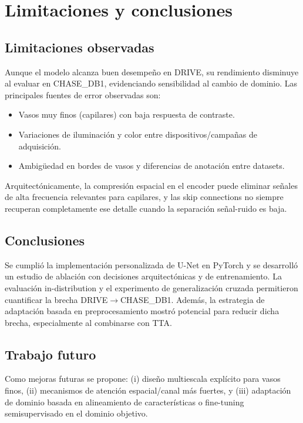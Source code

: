 \section{Limitaciones y conclusiones}
\subsection{Limitaciones observadas}
Aunque el modelo alcanza buen desempeño en DRIVE, su rendimiento disminuye al evaluar en CHASE\_DB1, evidenciando sensibilidad al cambio de dominio. Las principales fuentes de error observadas son:
\begin{itemize}
    \item Vasos muy finos (capilares) con baja respuesta de contraste.
    \item Variaciones de iluminación y color entre dispositivos/campañas de adquisición.
    \item Ambigüedad en bordes de vasos y diferencias de anotación entre datasets.
\end{itemize}

Arquitectónicamente, la compresión espacial en el encoder puede eliminar señales de alta frecuencia relevantes para capilares, y las skip connections no siempre recuperan completamente ese detalle cuando la separación señal-ruido es baja.

\subsection{Conclusiones}
Se cumplió la implementación personalizada de U-Net en PyTorch y se desarrolló un estudio de ablación con decisiones arquitectónicas y de entrenamiento. La evaluación in-distribution y el experimento de generalización cruzada permitieron cuantificar la brecha DRIVE$\rightarrow$CHASE\_DB1. Además, la estrategia de adaptación basada en preprocesamiento mostró potencial para reducir dicha brecha, especialmente al combinarse con TTA.

\subsection{Trabajo futuro}
Como mejoras futuras se propone: (i) diseño multiescala explícito para vasos finos, (ii) mecanismos de atención espacial/canal más fuertes, y (iii) adaptación de dominio basada en alineamiento de características o fine-tuning semisupervisado en el dominio objetivo.
